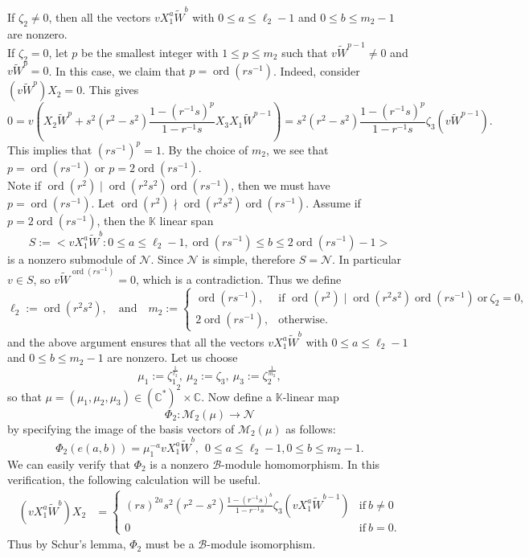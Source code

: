 \documentclass[12 pt,reqno]{amsart}
\numberwithin{equation}{section}
\newcommand{\B}{\mathcal{B}}
\DeclareMathOperator{\ord}{ord}
\theoremstyle{definition}
\theoremstyle{definition}
\theoremstyle{remark}
\theoremstyle{remark}
\begin{document}
\noindent If $\zeta_2 \neq 0$, then all the vectors $vX_1^{a}\tilde{W}^{b}$ with $0 \leq a \leq \ell_2-1$ and $0 \leq b \leq m_2-1$ are nonzero.\\
If $\zeta_2=0$, let $p$ be the smallest integer with $1 \leq p \leq m_2$ such that $v\tilde{W}^{p-1}\neq 0$ and $v\tilde{W}^p=0$. In this case, we claim that $p=\ord(rs^{-1})$. Indeed, consider $\left(v\tilde{W}^p\right)X_2=0$. This gives
\[0=v\left(X_2\tilde{W}^p+s^2(r^2-s^2)\displaystyle\frac{1-(r^{-1}s)^p}{1-r^{-1}s}X_3X_1\tilde{W}^{p-1}\right)=s^2(r^2-s^2)\displaystyle\frac{1-(r^{-1}s)^p}{1-r^{-1}s}\zeta_3(v\tilde{W}^{p-1}).\] This implies that $(rs^{-1})^p=1$. By the choice of $m_2$, we see that $p=\ord(rs^{-1})$ or $p=2\ord(rs^{-1})$.\\
Note if $\ord(r^2) \mid \ord(r^{2}s^2) \ord(rs^{-1})$, then we must have $p=\ord(rs^{-1})$. Let $\ord(r^2) \nmid \ord(r^{2}s^2) \ord(rs^{-1})$. Assume if $p=2\ord(rs^{-1})$, then the $\mathbb{K}$ linear span 
\[S:=\big<vX_{1}^a\tilde{W}^b:0 \leq a \leq \ell_2-1, \ord(rs^{-1})\leq b \leq 2\ord(rs^{-1})-1\big>\] is a nonzero submodule of $\mathcal{N}$. Since $\mathcal{N}$ is simple, therefore $S=\mathcal{N}$. In particular $v\in S$, so $v\tilde{W}^{\ord(rs^{-1})}=0$, which is a contradiction. Thus we define $$
  \ell_2 := \ord(r^{2}s^2), \quad \text{and}\quad   m_2 := 
    \begin{cases}
        \ord(rs^{-1}), & \text{if } \ord(r^2) \mid \ord(r^{2}s^2) \ord(rs^{-1}) \ \text{or} \  \zeta_2=0, \\[5pt]
        2\ord(rs^{-1}), & \text{otherwise}.
    \end{cases} 
$$ and the above argument ensures that all the vectors $vX_1^{a}\tilde{W}^{b}$ with $0 \leq a \leq \ell_2-1$ and $0 \leq b \leq m_2-1$ are nonzero. Let us choose
\[\mu_1:=\zeta_1^{\frac{1}{\ell_2}},\ \mu_2:=\zeta_3,\ \mu_3:=\zeta_2^{\frac{1}{m_2}},\] so that 
$\mu=(\mu_1,\mu_2,\mu_3)\in {(\mathbb{C}^*)}^2 \times \mathbb{C}$.  Now define a $\mathbb{K}$-linear map \[\Phi_2:\mathcal{M}_2(\mu)\rightarrow \mathcal{N}\] by specifying the image of the basis vectors of $\mathcal{M}_2(\mu)$ as follows:
\[\Phi_2\left(e(a,b)\right)=\mu_1^{-a}vX_{1}^a\tilde{W}^b,\ \ 0\leq a\leq \ell_2-1, 0 \leq b \leq m_2-1.\] We can easily verify that $\Phi_2$ is a nonzero $\B$-module homomorphism. In this verification, the following calculation will be useful.
\begin{align*}
    (vX_{1}^a\tilde{W}^b)X_2&=\begin{cases}
    (rs)^{2a}s^2(r^2-s^2)\displaystyle\frac{1-(r^{-1}s)^b}{1-r^{-1}s}\zeta_3\left(vX_1^{a}\tilde{W}^{b-1}\right)&\text{if}\ b\neq 0\\
    0&\text{if}\ b= 0.
    \end{cases}    
\end{align*} Thus by Schur's lemma, $\Phi_2$ must be a $\B$-module isomorphism.
\end{document}
